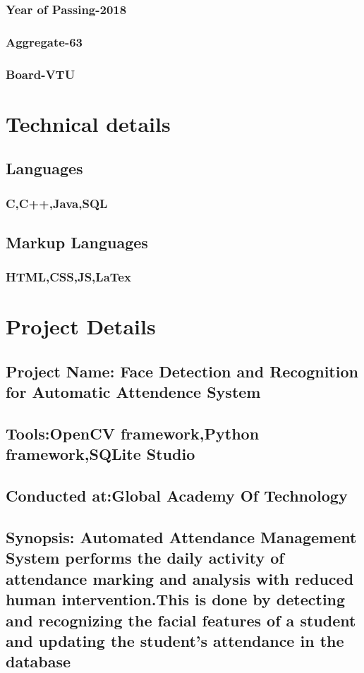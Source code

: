 \documentclass{article}
\begin{document}
\subsubsection{Year of Passing-2018}
\subsubsection{Aggregate-63}
\subsubsection{Board-VTU}
\section{Technical details}
\subsection{Languages}
\subsubsection{C,C++,Java,SQL}
\subsection{Markup Languages}
\subsubsection{HTML,CSS,JS,LaTex}
\section{Project Details}
\subsection{Project Name: Face Detection and Recognition for Automatic Attendence System}
\subsection{Tools:OpenCV framework,Python framework,SQLite Studio}
\subsection{Conducted at:Global Academy Of Technology}
\subsection{Synopsis: Automated Attendance Management System performs the daily activity of attendance marking and analysis with reduced human intervention.This is done by detecting and recognizing the facial features of a student and updating the student's attendance in the database}
\end{document}
